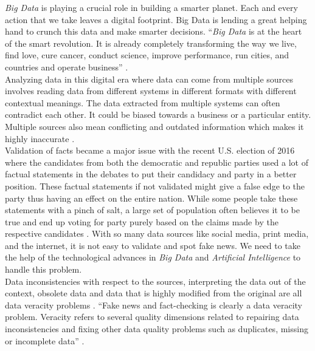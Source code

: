 \documentclass[sigconf]{acmart}
\begin{document}
{\em Big Data} is playing a crucial role in building a smarter planet. Each and every action that we take leaves a digital footprint. Big Data is lending a great helping hand to crunch this data and make smarter decisions. ``{\em Big Data} is at the heart of the smart revolution. It is already completely transforming the way we live, find love, cure cancer, conduct science, improve performance, run cities, and countries and operate business'' \cite{Marr2015}.  \\
Analyzing data in this digital era where data can come from multiple sources involves reading data from different systems in different formats with different contextual meanings. The data extracted from multiple systems can often contradict each other. It could be biased towards a business or a particular entity. Multiple sources also mean conflicting and outdated information which makes it highly inaccurate \cite{Berti-Equille2016}. \\
Validation of facts became a major issue with the recent U.S. election of 2016 where the candidates from both the democratic and republic parties used a lot of factual statements in the debates to put their candidacy and party in a better position. These factual statements if not validated might give a false edge to the party thus having an effect on the entire nation. While some people take these statements with a pinch of salt, a large set of population often believes it to be true and end up voting for party purely based on the claims made by the respective candidates \cite{www-forbes2}. With so many data sources like social media, print media, and the internet, it is not easy to validate and spot fake news. We need to take the help of the technological advances in {\em Big Data} and {\em Artificial Intelligence} to handle this problem.\\ 
Data inconsistencies with respect to the sources, interpreting the data out of the context, obsolete data and data that is highly modified from the original are all data veracity problems \cite{Berti-Equille2016}. ``Fake news and fact-checking is clearly a data veracity problem. Veracity refers to several quality dimensions related to repairing data inconsistencies and fixing other data quality problems such as duplicates, missing or incomplete data'' \cite{Berti-Equille2016}.
\end{document}
